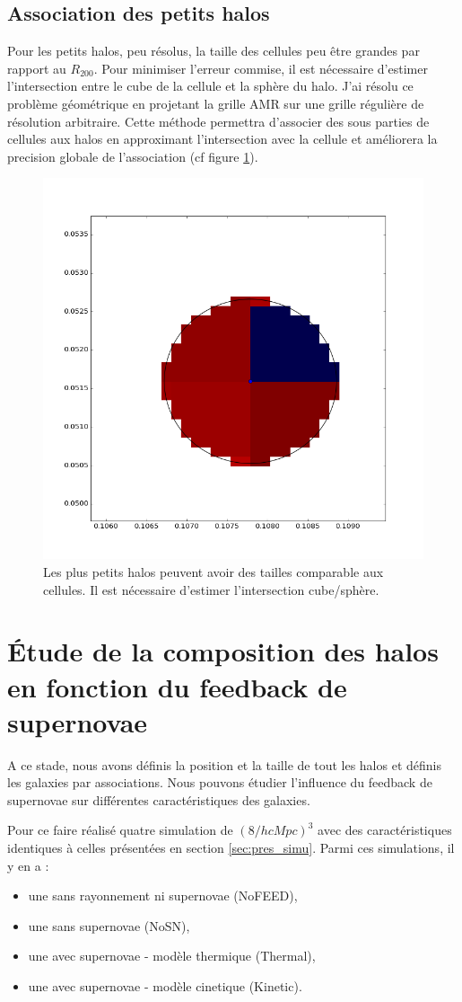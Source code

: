 \subsection{Association des petits halos}
Pour les petits halos, peu résolus, la taille des cellules peu être grandes par rapport au $R_{200}$.
Pour minimiser l'erreur commise, il est nécessaire d’estimer l'intersection entre le cube de la cellule et la sphère du halo.
J'ai résolu ce problème géométrique en projetant la grille \ac{AMR} sur une grille régulière de résolution arbitraire.
Cette méthode permettra d'associer des sous parties de cellules aux halos en approximant l'intersection avec la cellule et améliorera la precision globale de l'association (cf figure \ref{fig:intersec}).

\begin{figure}
	\centering
	\includegraphics[width=.45\linewidth]{img/03/intersec.png}
    \caption[Projection des petits halo]{Les plus petits halos peuvent avoir des tailles comparable aux cellules.
    Il est nécessaire d’estimer l'intersection cube/sphère.
 	\label{fig:intersec}}
\end{figure}

\clearpage
\section{Étude de la composition des halos en fonction du feedback de supernovae}

A ce stade, nous avons définis la position et la taille de tout les halos et définis les galaxies par associations.
Nous pouvons étudier l'influence du feedback de supernovae sur différentes caractéristiques des galaxies.

Pour ce faire réalisé quatre simulation de $\left(8/h cMpc \right)^3$ avec des caractéristiques identiques à celles présentées en section \ref{sec:pres_simu}.
Parmi ces simulations, il y en a :
\begin{itemize}
\item une sans rayonnement ni supernovae (NoFEED),
\item une sans supernovae (NoSN),
\item une avec supernovae - modèle thermique (Thermal),
\item une avec supernovae - modèle cinetique (Kinetic).
\end{itemize}


